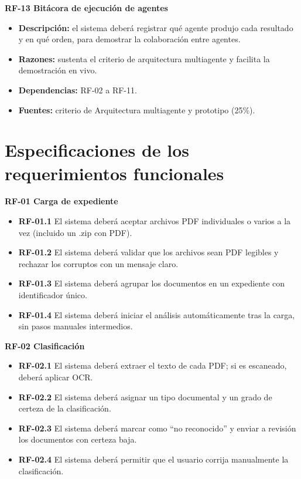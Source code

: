 \documentclass[11pt, a4paper]{article}
\begin{document}
\textbf{RF-13 Bitácora de ejecución de agentes}
\begin{itemize}
    \item \textbf{Descripción:} el sistema deberá registrar qué agente produjo cada resultado y en qué orden, para demostrar la colaboración entre agentes.
    \item \textbf{Razones:} sustenta el criterio de arquitectura multiagente y facilita la demostración en vivo.
    \item \textbf{Dependencias:} RF-02 a RF-11.
    \item \textbf{Fuentes:} criterio de Arquitectura multiagente y prototipo (25\%).
\end{itemize}

\section{Especificaciones de los requerimientos funcionales}

\textbf{RF-01 Carga de expediente}
\begin{itemize}
    \item \textbf{RF-01.1} El sistema deberá aceptar archivos PDF individuales o varios a la vez (incluido un .zip con PDF).
    \item \textbf{RF-01.2} El sistema deberá validar que los archivos sean PDF legibles y rechazar los corruptos con un mensaje claro.
    \item \textbf{RF-01.3} El sistema deberá agrupar los documentos en un expediente con identificador único.
    \item \textbf{RF-01.4} El sistema deberá iniciar el análisis automáticamente tras la carga, sin pasos manuales intermedios.
\end{itemize}

\textbf{RF-02 Clasificación}
\begin{itemize}
    \item \textbf{RF-02.1} El sistema deberá extraer el texto de cada PDF; si es escaneado, deberá aplicar OCR.
    \item \textbf{RF-02.2} El sistema deberá asignar un tipo documental y un grado de certeza de la clasificación.
    \item \textbf{RF-02.3} El sistema deberá marcar como ``no reconocido'' y enviar a revisión los documentos con certeza baja.
    \item \textbf{RF-02.4} El sistema deberá permitir que el usuario corrija manualmente la clasificación.
\end{itemize}
\end{document}

